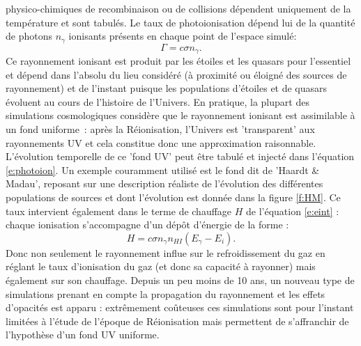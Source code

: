  physico-chimiques de recombinaison ou de collisions dépendent uniquement de la température et sont tabulés. Le taux de photoionisation dépend lui de la quantité de photons $n_\gamma$ ionisants présents en chaque point de l'espace simulé:
\begin{equation}
\Gamma=c\sigma n_\gamma.
\label{e:photoion}
\end{equation}
Ce rayonnement ionisant est produit par les étoiles et les quasars pour l'essentiel et dépend dans l'absolu du lieu considéré (à proximité ou éloigné des sources de rayonnement) et de l'instant puisque les populations d'étoiles et de quasars évoluent au cours de l'histoire de l'Univers. En pratique, la plupart des simulations cosmologiques considère que le rayonnement ionisant est assimilable à un fond uniforme~: après la Réionisation, l'Univers est 'transparent' aux rayonnements UV et cela constitue donc une approximation raisonnable. L'évolution temporelle de ce 'fond UV' peut être tabulé et injecté dans l'équation \ref{e:photoion}. Un exemple couramment utilisé est le fond dit de 'Haardt \& Madau', reposant sur une description réaliste de l'évolution des différentes populations de sources et dont l'évolution est donnée dans la figure \ref{f:HM}. Ce taux intervient également dans le terme de chauffage $H$ de l'équation \ref{e:eint} : chaque ionisation s'accompagne d'un dépôt d'énergie de la forme :
\begin{equation}
H=c \sigma n_\gamma n_{HI} (E_\gamma-E_i).
\end{equation}
Donc non seulement le rayonnement influe sur le refroidissement du gaz en réglant le taux d'ionisation du gaz (et donc sa capacité à rayonner) mais également sur son chauffage. Depuis un peu moins de 10 ans, un nouveau type de simulations prenant en compte la propagation du rayonnement et les effets d'opacités  est apparu : extrêmement coûteuses ces simulations sont pour l'instant limitées à l'étude de l'époque de Réionisation mais permettent de s'affranchir de l'hypothèse d'un fond UV uniforme. 

